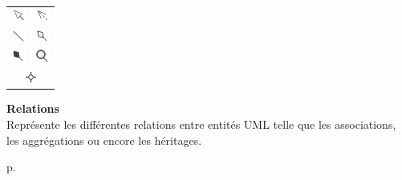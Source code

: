\begin{minipage}[c]{.2\textwidth}
    \begin{rightborder}\begin{tabular}{cc}
        \includegraphics{images/icon/generalize.png} &
        \includegraphics{images/icon/dependency.png} \\
        \includegraphics{images/icon/association.png} &
        \includegraphics{images/icon/aggregation.png} \\
        \includegraphics{images/icon/composition.png} &
        \includegraphics{images/icon/innerClass.png} \\
        \multicolumn{2}{c}{\includegraphics[width=13px]{images/icon/multi.png}} \\
    \end{tabular}\end{rightborder}
\end{minipage}
\begin{minipage}[c]{.1\textwidth}\end{minipage}
\begin{minipage}[c]{.6\textwidth}
    \textbf{Relations} \\
    Représente les différentes relations entre entités UML telle que les associations, les aggrégations ou encore les héritages.
\end{minipage}
\begin{minipage}[c]{.1\textwidth}
    \hfill
    p.{\LARGE \pageref{sec:relations}}
\end{minipage}


